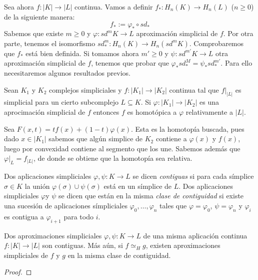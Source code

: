 \documentclass[HS.tex]{subfiles}
\begin{document}
Sea ahora $f:|K|\to|L|$ continua. Vamos a definir $f_*:H_n(K)\to H_n(L)$ ($n\geq 0$) de la siguiente manera:
\[
f_*:=\varphi_*\circ sd_*
\]
Sabemos que existe $m\geq 0$ y $\varphi:sd^mK\to L$ aproximación simplicial de $f$. Por otra parte, tenemos el isomorfismo $sd_*^m:H_n(K)\to H_n(sd^mK)$. Comprobaremos que $f_*$ está bien definida. Si tomamos ahora $m'\geq 0$ y $\psi:sd^{m'}K\to L$ otra aproximación simplicial de $f$, tenemos que probar que $\varphi_*sd_*^M=\psi_*sd_*^{m'}$. Para ello necesitaremos algunos resultados previos.

\begin{prop}
Sean $K_1$ y $K_2$ complejos simpliciales y $f:|K_1|\to|K_2|$ continua tal que $f|_{|L|}$ es simplicial para un cierto subcomplejo $L\subseteq K$. Si $\varphi:|K_1|\to|K_2|$ es una aprocimación simplicial de $f$ entonces $f$ es homotópica a $\varphi$ relativamente a $|L|$.  
\end{prop}
\begin{dem}
Sea $F(x,t)=tf(x)+(1-t)\varphi(x)$. Esta es la homotopía buscada, pues dado $x\in|K_1|$ sabemos que algún simplice de $K_2$ contiene a $\varphi(x)$ y $f(x)$, luego por convexidad contiene al segmento que los une. Sabemos además que $\varphi|_{L}=f_{|L|}$, de donde se obtiene que la homotopía sea relativa.
\QED
\end{dem}

\begin{defi}
Dos aplicaciones simpliciales $\varphi,\psi:K\to L$ se dicen \emph{contiguas} si para cada símplice $\sigma\in K$ la unión $\varphi(\sigma)\cup\psi(\sigma)$ está en un símplice de $L$. Dos aplicaciones simpliciales $\varphi$y $\psi$ se dicen que están en la misma \emph{clase de contiguidad} si existe una sucesión de aplicaciones símpliciales $\varphi_0,\dots, \varphi_n$ tales que $\varphi=\varphi_0$, $\psi=\varphi_n$ y $\varphi_i$ es contigua a $\varphi_{i+1}$ para todo $i$. 
\end{defi}

\begin{lemma}
Dos aproximaciones simpliciales $\varphi,\psi:K\to L$ de una misma aplicación continua $f:|K|\to|L|$ son contiguas. Más aún, si $f\simeq_H g$, existen aproximaciones simpliciales de $f$ y $g$ en la misma clase de contiguidad.
\end{lemma}
\begin{proof}

\end{proof}
\end{document}
